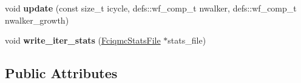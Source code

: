 \begin{DoxyCompactItemize}
\item 
void {\bfseries update} (const size\+\_\+t icycle, defs\+::wf\+\_\+comp\+\_\+t nwalker, defs\+::wf\+\_\+comp\+\_\+t nwalker\+\_\+growth)\hypertarget{classPropagator_aaef6837a7e4ba4d2e2a45e88263ee93f}{}\label{classPropagator_aaef6837a7e4ba4d2e2a45e88263ee93f}

\item 
void {\bfseries write\+\_\+iter\+\_\+stats} (\hyperlink{structFciqmcStatsFile}{Fciqmc\+Stats\+File} $\ast$stats\+\_\+file)\hypertarget{classPropagator_aec8f6876201ced3fd9679a9ca7a69932}{}\label{classPropagator_aec8f6876201ced3fd9679a9ca7a69932}

\end{DoxyCompactItemize}
\subsection*{Public Attributes}
